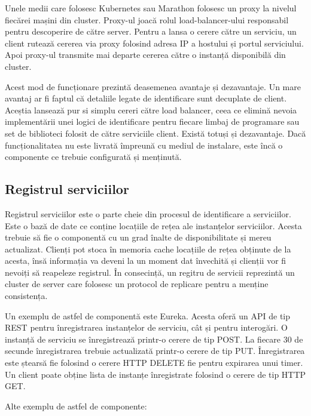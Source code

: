 \documentclass[12pt, a4paper, oneside, romanian]{teza-upb}
\begin{document}
Unele medii care folosesc Kubernetes sau Marathon folosesc un proxy la nivelul fiecărei mașini din cluster. Proxy-ul joacă rolul load-balancer-ului responsabil pentru descoperire de către server. Pentru a lansa o cerere către un serviciu, un client rutează cererea via proxy folosind adresa IP a hostului și portul serviciului. Apoi proxy-ul transmite mai departe cererea către o instanță disponibilă din cluster.

Acest mod de funcționare prezintă deasemenea avantaje și dezavantaje. Un mare avantaj ar fi faptul că detaliile legate de identificare sunt decuplate de client. Aceștia lansează pur si simplu cereri către load balancer, ceea ce elimină nevoia implementării unei logici de identificare pentru fiecare limbaj de programare sau set de biblioteci folosit de către serviciile client. Există totuși și dezavantaje. Dacă funcționalitatea nu este livrată împreună cu mediul de instalare, este încă o componente ce trebuie configurată și menținută. 

\subsection{Registrul serviciilor}
Registrul serviciilor este o parte cheie din procesul de identificare a serviciilor. Este o bază de date ce conține locațiile de rețea ale instanțelor serviciilor. Acesta trebuie să fie o componentă cu un grad înalte de disponibilitate și mereu actualizat. Clienți pot stoca în memoria cache locațiile de rețea obținute de la acesta, însă informația va deveni la un moment dat învechită și clienții vor fi nevoiți să reapeleze registrul. În consecință, un regitru de servicii reprezintă un cluster de server care folosesc un protocol de replicare pentru a menține consistența.

Un exemplu de astfel de componentă este Eureka. Acesta oferă un API de tip REST pentru înregistrarea instanțelor de serviciu, cât și pentru interogări. O instanță de serviciu se înregistrează printr-o cerere de tip POST. La fiecare 30 de secunde înregistrarea trebuie actualizată printr-o cerere de tip PUT. Înregistrarea este ștearsă fie folosind o cerere HTTP DELETE fie pentru expirarea unui timer. Un client poate obține lista de instanțe înregistrate folosind o cerere de tip HTTP GET.

Alte exemplu de astfel de componente:
\end{document}
